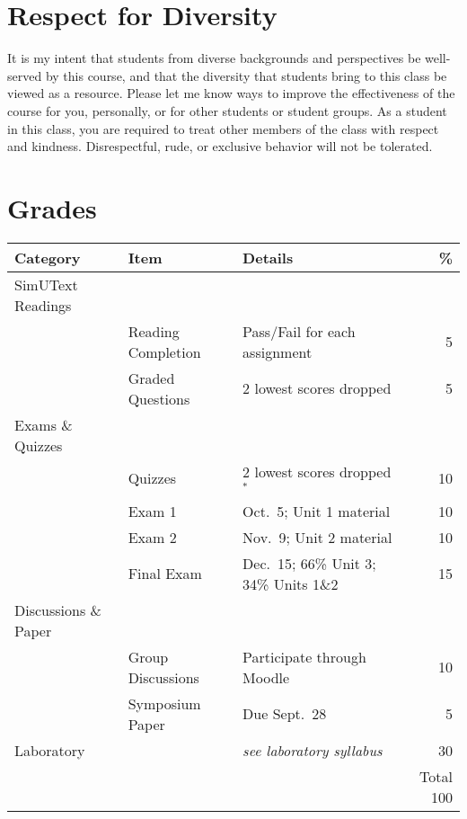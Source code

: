 \documentclass{tufte-handout}
\begin{document}
\begin{fullwidth}
\section{Respect for Diversity}

It is my intent that students from diverse backgrounds and perspectives be well-served by this course, and that the diversity that students bring to this class be viewed as a resource. Please let me know ways to improve the effectiveness of the course for you, personally, or for other students or student groups. As a student in this class, you are required to treat other members of the class with respect and kindness. Disrespectful, rude, or exclusive behavior will not be tolerated.

\section{Grades}


\begin{table}
\begin{tabular}{l l l r}
Category & Item & Details & \% \\
\hline
SimUText Readings & \\
& Reading Completion & Pass/Fail for each assignment & 5 \\
& Graded Questions & 2 lowest scores dropped & 5 \\
\hline
Exams \& Quizzes \\
& Quizzes & 2 lowest scores dropped$^*$ & 10 \\
& Exam 1 & Oct.~5; Unit 1 material & 10 \\
& Exam 2 & Nov.~9; Unit 2 material & 10 \\
& Final Exam & Dec.~15; 66\% Unit 3; 34\% Units 1\&2 & 15 \\ 							%
\hline 
Discussions \& Paper \\
& Group Discussions & Participate through Moodle & 10 \\
 & Symposium Paper & Due Sept.~28 & 5 \\
\hline
Laboratory & & \emph{see laboratory syllabus} & 30 \\
\hline
& & & Total 100
\end{tabular}
\end{table}

\end{fullwidth}
\end{document}
